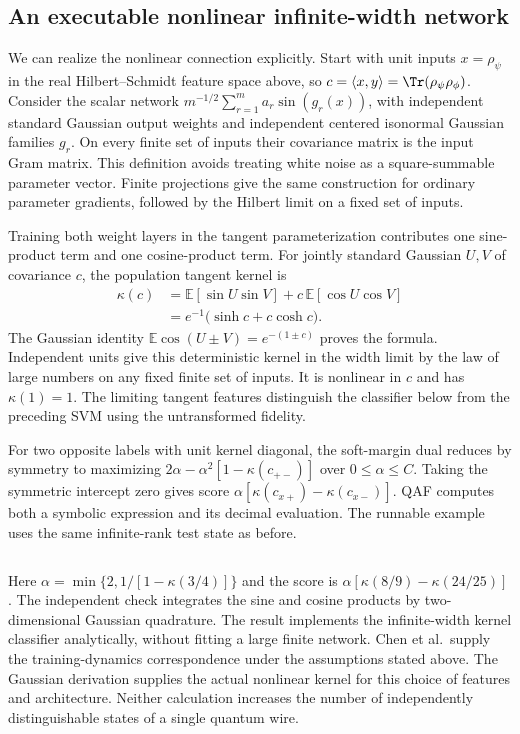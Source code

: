 \subsection{An executable nonlinear infinite-width network}
We can realize the nonlinear connection explicitly. Start with unit inputs $x=\rho_\psi$ in the real Hilbert--Schmidt feature space above, so $c=\langle x,y\rangle=\Tr(\rho_\psi\rho_\phi)$. Consider the scalar network $m^{-1/2}\sum_{r=1}^{m}a_r\sin(g_r(x))$, with independent standard Gaussian output weights and independent centered isonormal Gaussian families $g_r$. On every finite set of inputs their covariance matrix is the input Gram matrix. This definition avoids treating white noise as a square-summable parameter vector. Finite projections give the same construction for ordinary parameter gradients, followed by the Hilbert limit on a fixed set of inputs.

Training both weight layers in the tangent parameterization contributes one sine-product term and one cosine-product term. For jointly standard Gaussian $U,V$ of covariance $c$, the population tangent kernel is
\begin{align}
 \kappa(c)
 &=\mathbb E[\sin U\sin V]+c\,\mathbb E[\cos U\cos V] \nonumber\\
 &=e^{-1}\bigl(\sinh c+c\cosh c\bigr). \label{eq:sine}
\end{align}
The Gaussian identity $\mathbb E\cos(U\pm V)=e^{-(1\pm c)}$ proves the formula. Independent units give this deterministic kernel in the width limit by the law of large numbers on any fixed finite set of inputs. It is nonlinear in $c$ and has $\kappa(1)=1$. The limiting tangent features distinguish the classifier below from the preceding SVM using the untransformed fidelity.

For two opposite labels with unit kernel diagonal, the soft-margin dual reduces by symmetry to maximizing $2\alpha-\alpha^2[1-\kappa(c_{+-})]$ over $0\le\alpha\le C$. Taking the symmetric intercept zero gives score $\alpha[\kappa(c_{x+})-\kappa(c_{x-})]$. QAF computes both a symbolic expression and its decimal evaluation. The runnable example uses the same infinite-rank test state as before.
\inputminted{qaf}{examples/prefix/nonlinear.qaf}
Here $\alpha=\min\{2,1/[1-\kappa(3/4)]\}$ and the score is $\alpha[\kappa(8/9)-\kappa(24/25)]$. The independent check integrates the sine and cosine products by two-dimensional Gaussian quadrature. The result implements the infinite-width kernel classifier analytically, without fitting a large finite network. Chen et al.\ supply the training-dynamics correspondence under the assumptions stated above. The Gaussian derivation supplies the actual nonlinear kernel for this choice of features and architecture. Neither calculation increases the number of independently distinguishable states of a single quantum wire.
